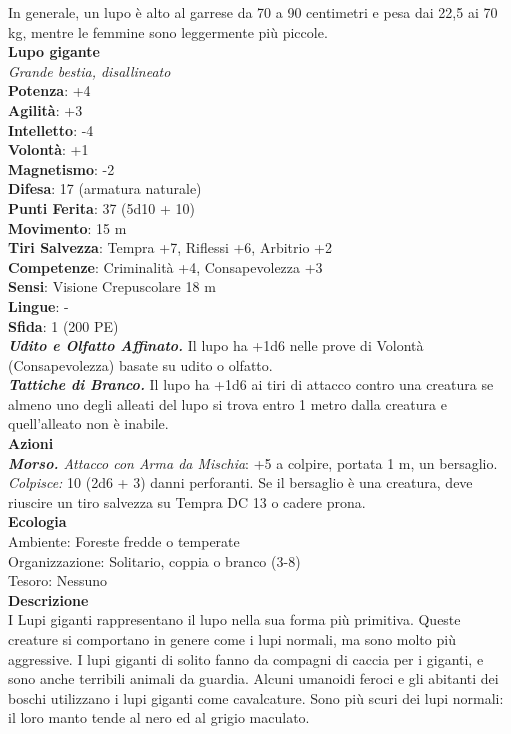 \begin{multicols}{2}
In generale, un lupo è alto al garrese da 70 a 90 centimetri e pesa dai 22,5 ai 70 kg, mentre le femmine sono leggermente più piccole. \\

\medskip\textbf{Lupo gigante}\\
\emph{Grande bestia, disallineato}\\
\textbf{Potenza}: +4\\
\textbf{Agilità}: +3\\
\textbf{Intelletto}: -4\\
\textbf{Volontà}: +1\\
\textbf{Magnetismo}: -2\\
\textbf{Difesa}: 17 (armatura naturale)\\
\textbf{Punti Ferita}: 37 (5d10 + 10)\\
\textbf{Movimento}: 15 m\\
\textbf{Tiri Salvezza}: Tempra +7, Riflessi +6, Arbitrio +2 \\
\textbf{Competenze}: Criminalità +4, Consapevolezza +3\\
\textbf{Sensi}: Visione Crepuscolare 18 m\\
\textbf{Lingue}: -\\
\textbf{Sfida}: 1 (200 PE)\smallskip\\
\emph{\textbf{Udito e Olfatto Affinato.}} Il lupo ha +1d6 nelle prove di Volontà (Consapevolezza) basate su udito o olfatto.\\
\emph{\textbf{Tattiche di Branco.}} Il lupo ha +1d6 ai tiri di attacco contro una creatura se almeno uno degli alleati del lupo si trova entro 1 metro dalla creatura e quell'alleato non è inabile.\\
\smallskip\textbf{Azioni}\\
\emph{\textbf{Morso.} Attacco con Arma da Mischia}: +5 a colpire, portata 1 m, un bersaglio.\\
\emph{Colpisce:} 10 (2d6 + 3) danni perforanti. Se il bersaglio è una creatura, deve riuscire un tiro salvezza su Tempra DC 13 o cadere prona.\\
\textbf{Ecologia}\\
Ambiente: Foreste fredde o temperate\\
Organizzazione: Solitario, coppia o branco (3-8)\\
Tesoro: Nessuno\\
\textbf{Descrizione}\\

I Lupi giganti rappresentano il lupo nella sua forma più primitiva. Queste creature si comportano in genere come i lupi normali, ma sono molto più aggressive. I lupi giganti di solito fanno da compagni di caccia per i giganti, e sono anche terribili animali da guardia. Alcuni umanoidi feroci e gli abitanti dei boschi utilizzano i lupi giganti come cavalcature. Sono più scuri dei lupi normali: il loro manto tende al nero ed al grigio maculato.\\


\end{multicols}

